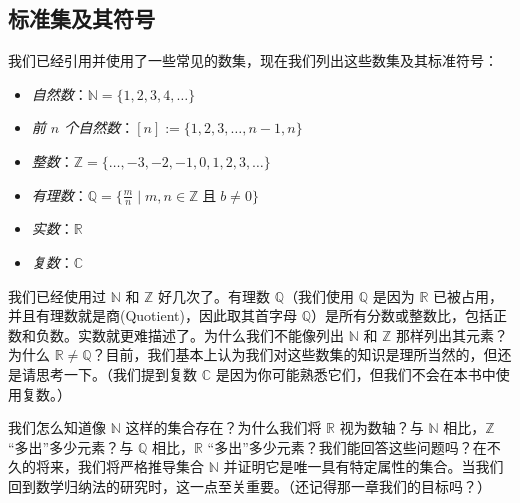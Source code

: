 \subsection{标准集及其符号}

我们已经引用并使用了一些常见的数集，现在我们列出这些数集及其标准符号：

\begin{center}
\begin{itemize}
    \item \emph{自然数}：$\mathbb{N} = \{1, 2, 3, 4, \dots \}$
    \item \emph{前 $n$ 个自然数}：$[n] := \{1, 2, 3, \dots , n-1, n \}$
    \item \emph{整数}：$\mathbb{Z} = \{\dots, -3, -2, -1, 0, 1, 2, 3, \dots \}$
    \item \emph{有理数}：$\mathbb{Q} = \{\frac{m}{n} \mid m,n \in \mathbb{Z} \;\text{且}\; b \ne 0 \}$
    \item \emph{实数}：$\mathbb{R}$
    \item \emph{复数}：$\mathbb{C}$
\end{itemize}
\end{center}

我们已经使用过 $\mathbb{N}$ 和 $\mathbb{Z}$ 好几次了。有理数 $\mathbb{Q}$（我们使用 $\mathbb{Q}$ 是因为 $\mathbb{R}$ 已被占用，并且有理数就是商(Quotient)，因此取其首字母 $\mathbb{Q}$）是所有分数或整数比，包括正数和负数。实数就更难描述了。为什么我们不能像列出 $\mathbb{N}$ 和 $\mathbb{Z}$ 那样列出其元素？为什么 $\mathbb{R} \ne \mathbb{Q}$？目前，我们基本上认为我们对这些数集的知识是理所当然的，但还是请思考一下。（我们提到复数 $\mathbb{C}$ 是因为你可能熟悉它们，但我们不会在本书中使用复数。）

我们怎么知道像 $\mathbb{N}$ 这样的集合存在？为什么我们将 $\mathbb{R}$ 视为数轴？与 $\mathbb{N}$ 相比，$\mathbb{Z}$ ``多出''多少元素？与 $\mathbb{Q}$ 相比，$\mathbb{R}$ ``多出''多少元素？我们能回答这些问题吗？在不久的将来，我们将严格推导集合 $\mathbb{N}$ 并证明它是唯一具有特定属性的集合。当我们回到数学归纳法的研究时，这一点至关重要。（还记得那一章我们的目标吗？）
